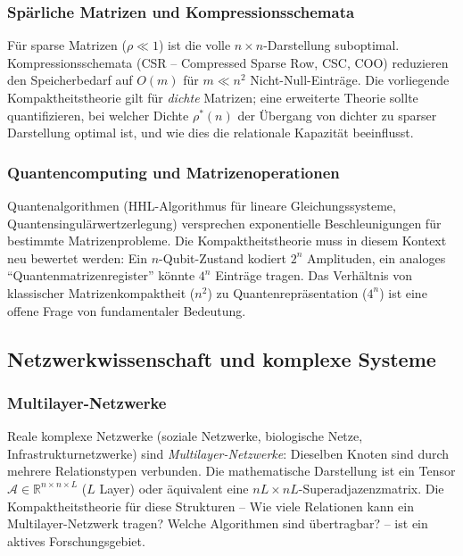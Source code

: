 ﻿\documentclass[12pt, a4paper]{article}
\theoremstyle{definition}
\theoremstyle{remark}
\newcommand{\R}{\mathbb{R}}
\begin{document}
\subsubsection*{Spärliche Matrizen und Kompressionsschemata}

Für sparse Matrizen ($\rho \ll 1$) ist die volle $n \times n$-Darstellung
suboptimal. Kompressionsschemata (CSR -- Compressed Sparse Row, CSC, COO)
reduzieren den Speicherbedarf auf $O(m)$ für $m \ll n^2$ Nicht-Null-Einträge.
Die vorliegende Kompaktheitstheorie gilt für \emph{dichte} Matrizen; eine
erweiterte Theorie sollte quantifizieren, bei welcher Dichte $\rho^*(n)$
der Übergang von dichter zu sparser Darstellung optimal ist, und wie
dies die relationale Kapazität beeinflusst.

\subsubsection*{Quantencomputing und Matrizenoperationen}

Quantenalgorithmen (HHL-Algorithmus für lineare Gleichungssysteme,
Quantensingulärwertzerlegung) versprechen exponentielle Beschleunigungen
für bestimmte Matrizenprobleme. Die Kompaktheitstheorie muss in diesem
Kontext neu bewertet werden: Ein $n$-Qubit-Zustand kodiert $2^n$
Amplituden, ein analoges ``Quantenmatrizenregister'' könnte $4^n$
Einträge tragen. Das Verhältnis von klassischer Matrizenkompaktheit
($n^2$) zu Quantenrepräsentation ($4^n$) ist eine offene Frage von
fundamentaler Bedeutung.

\subsection{Netzwerkwissenschaft und komplexe Systeme}
\label{subsec:netzwerk}

\subsubsection*{Multilayer-Netzwerke}

Reale komplexe Netzwerke (soziale Netzwerke, biologische Netze,
Infrastrukturnetzwerke) sind \emph{Multilayer-Netzwerke}: Dieselben
Knoten sind durch mehrere Relationstypen verbunden. Die mathematische
Darstellung ist ein Tensor $\mathcal{A} \in \R^{n \times n \times L}$
($L$ Layer) oder äquivalent eine $nL \times nL$-Superadjazenzmatrix.
Die Kompaktheitstheorie für diese Strukturen -- Wie viele Relationen
kann ein Multilayer-Netzwerk tragen? Welche Algorithmen sind übertragbar?
-- ist ein aktives Forschungsgebiet.
\end{document}
